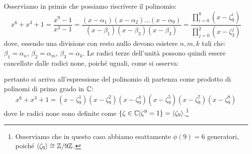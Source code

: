 \documentclass[11pt]{scrartcl}
\begin{document}
\begin{soln}
Osserviamo in primis che possiamo riscrivere il polinomio:
	\[ x^6+x^3+1 = \frac{x^9-1}{x^3-1} = \frac{(x - \alpha_1)(x - \alpha_2) \ldots (x - \alpha_9)}{(x - \beta_1)(x - \beta_2)(x - \beta_3)} = \frac{\prod_{i=0}^{8}(x - \zeta_9^i)}{\prod_{j=0}^{2} (x - \zeta_3^j)}
	\]
dove, essendo una divisione con resto nullo devono esistere $n,m,k$ tali che: $\beta_1 = \alpha_n$, $\beta_2 = \alpha_m$, $\beta_3 = \alpha_k$. Le radici terze dell'unità possono quindi essere cancellate dalle radici none, poiché uguali, come si osserva:
\begin{center}
\end{center}
pertanto si arriva all'espressione del polinomio di partenza come prodotto di polinomi di primo grado in $\mathbb C$:
	\[ x^6+x^3+1 = (x - \zeta_9^1) (x - \zeta_9^2) (x - \zeta_9^4) (x - \zeta_9^5) (x - \zeta_9^7) (x - \zeta_9^8)
	\]
dove le radici none sono definite come $\{\zeta \in \mathbb C | \zeta^ 9 = 1\} = \left<\zeta_9\right>$.\footnote{Osserviamo che in questo caso abbiamo esattamente $\phi(9) = 6$ generatori, poiché $\left<\zeta_9\right> \cong \mathbb Z/9\mathbb Z$.}
\end{soln}
\end{document}
